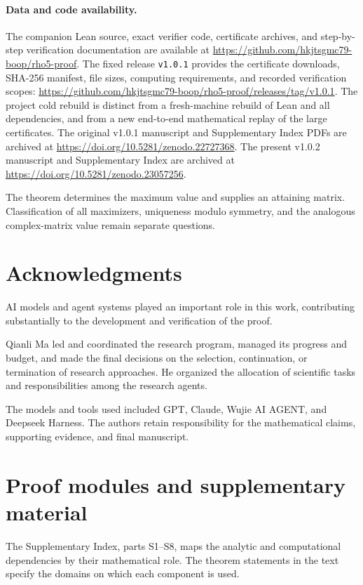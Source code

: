 \documentclass[11pt,reqno]{amsart}
\theoremstyle{definition}
\theoremstyle{remark}
\begin{document}
\paragraph{Data and code availability.}
The companion Lean source, exact verifier code, certificate archives,
and step-by-step verification documentation are available at
\url{https://github.com/hkjtsgmc79-boop/rho5-proof}.
The fixed release \texttt{v1.0.1} provides the certificate downloads,
SHA-256 manifest, file sizes, computing requirements, and recorded
verification scopes:
\url{https://github.com/hkjtsgmc79-boop/rho5-proof/releases/tag/v1.0.1}.
The project cold rebuild is distinct from a fresh-machine rebuild of
Lean and all dependencies, and from a new end-to-end mathematical
replay of the large certificates. The original v1.0.1 manuscript and
Supplementary Index PDFs are archived at
\url{https://doi.org/10.5281/zenodo.22727368}.
The present v1.0.2 manuscript and Supplementary Index are archived at
\url{https://doi.org/10.5281/zenodo.23057256}.

The theorem determines the maximum value and supplies an attaining
matrix. Classification of all maximizers, uniqueness modulo symmetry,
and the analogous complex-matrix value remain separate questions.

\section*{Acknowledgments}
AI models and agent systems played an important role in this work,
contributing substantially to the development and verification of the proof.

Qianli Ma led and coordinated the research program, managed its
progress and budget, and made the final decisions on the selection,
continuation, or termination of research approaches. He organized
the allocation of scientific tasks and responsibilities among the
research agents.

The models and tools used included GPT, Claude, Wujie AI AGENT,
and Deepseek Harness. The authors retain responsibility for the
mathematical claims, supporting evidence, and final manuscript.

\appendix
\section{Proof modules and supplementary material}\label{app:artifacts}

The Supplementary Index, parts S1--S8, maps the analytic and computational
dependencies by their mathematical role. The theorem statements in the
text specify the domains on which each component is used.
\end{document}
